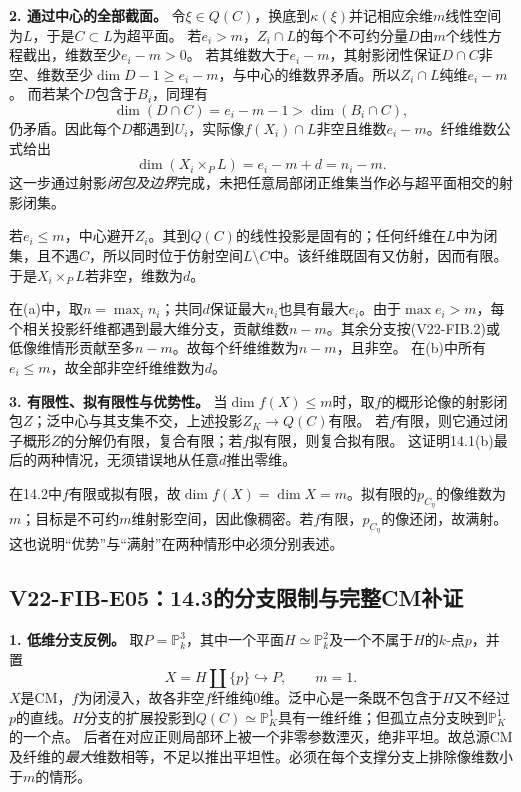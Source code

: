 \noindent\textbf{2. 通过中心的全部截面。}
令$\xi\in Q(C)$，换底到$\kappa(\xi)$并记相应余维$m$线性空间为$L$，于是$C\subset L$为超平面。
若$e_i>m$，$Z_i\cap L$的每个不可约分量$D$由$m$个线性方程截出，维数至少$e_i-m>0$。
若其维数大于$e_i-m$，其射影闭性保证$D\cap C$非空、维数至少$\dim D-1\geq e_i-m$，与中心的维数界矛盾。所以$Z_i\cap L$纯维$e_i-m$。
而若某个$D$包含于$B_i$，同理有
\[
\dim(D\cap C)=e_i-m-1>\dim(B_i\cap C),
\]
仍矛盾。因此每个$D$都遇到$U_i$，实际像$f(X_i)\cap L$非空且维数$e_i-m$。纤维维数公式给出
\[
\dim(X_i\times_P L)=e_i-m+d=n_i-m.
\tag{V22-FIB.2}
\]
这一步通过射影\emph{闭包及边界}完成，未把任意局部闭正维集当作必与超平面相交的射影闭集。

若$e_i\leq m$，中心避开$Z_i$。其到$Q(C)$的线性投影是固有的；任何纤维在$L$中为闭集，且不遇$C$，所以同时位于仿射空间$L\setminus C$中。该纤维既固有又仿射，因而有限。于是$X_i\times_P L$若非空，维数为$d$。

在(a)中，取$n=\max_i n_i$；共同$d$保证最大$n_i$也具有最大$e_i$。由于$\max e_i>m$，每个相关投影纤维都遇到最大维分支，贡献维数$n-m$。其余分支按(V22-FIB.2)或低像维情形贡献至多$n-m$。故每个纤维维数为$n-m$，且非空。
在(b)中所有$e_i\leq m$，故全部非空纤维维数为$d$。

\noindent\textbf{3. 有限性、拟有限性与优势性。}
当$\dim f(X)\leq m$时，取$f$的概形论像的射影闭包$Z$；泛中心与其支集不交，上述投影$Z_K\to Q(C)$有限。
若$f$有限，则它通过闭子概形$Z$的分解仍有限，复合有限；若$f$拟有限，则复合拟有限。
这证明14.1(b)最后的两种情况，无须错误地从任意$d$推出零维。

在14.2中$f$有限或拟有限，故$\dim f(X)=\dim X=m$。拟有限的$p_{C_\eta}$的像维数为$m$；目标是不可约$m$维射影空间，因此像稠密。若$f$有限，$p_{C_\eta}$的像还闭，故满射。这也说明“优势”与“满射”在两种情形中必须分别表述。

\subsection*{V22-FIB-E05：14.3的分支限制与完整CM补证}

\noindent\textbf{1. 低维分支反例。}
取$P=\mathbb P^3_k$，其中一个平面$H\simeq\mathbb P^2_k$及一个不属于$H$的$k$-点$p$，并置
\[
X=H\amalg\{p\}\hookrightarrow P,\qquad m=1.
\]
$X$是CM，$f$为闭浸入，故各非空$f$纤维纯0维。泛中心是一条既不包含于$H$又不经过$p$的直线。$H$分支的扩展投影到$Q(C)\simeq\mathbb P^1_K$具有一维纤维；但孤立点分支映到$\mathbb P^1_K$的一个点。
后者在对应正则局部环上被一个非零参数湮灭，绝非平坦。故总源CM及纤维的\emph{最大}维数相等，不足以推出平坦性。必须在每个支撑分支上排除像维数小于$m$的情形。

